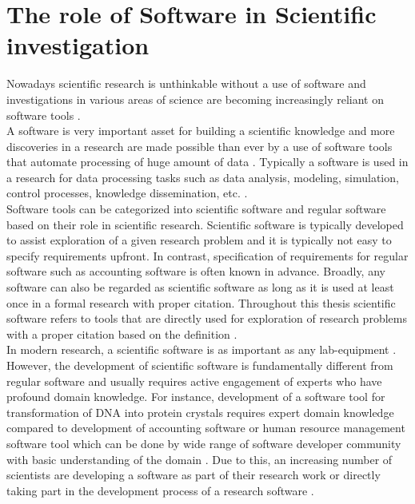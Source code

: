 \chapter{The role of Software in Scientific investigation}
\label{ch:Roles}

%

Nowadays scientific research is unthinkable without a use of software and investigations in various areas of science are becoming increasingly reliant on software tools \citep{goble2014better, storer2017bridging, hannay2009scientists, jimenez2017four}. \\

A software is very important asset for building a scientific knowledge and more discoveries in a research are made possible than ever by a use of software tools that automate processing of huge amount of data \citep{jimenez2017four}. Typically a software is used in a research for data processing tasks such as data analysis, modeling, simulation, control processes, knowledge dissemination, etc. \citep{hannay2009scientists, pan2016disciplinary}. \\


Software tools can be categorized into scientific software and regular software based on their role in scientific research. Scientific software is typically developed to assist exploration of a given research problem and it is typically not easy to specify requirements upfront. In contrast, specification of requirements for regular software such as accounting software is often known in advance. Broadly, any software can also be regarded as scientific software as long as it is used at least once in a formal research with proper citation. Throughout this thesis scientific software refers to tools that are directly used for exploration of research problems with a proper citation based on the definition \citep{hannay2009scientists,goble2014better}. \\


In modern research, a scientific software is as important as any lab-equipment \citep{wilson2014best}. However, the development of scientific software is fundamentally different from regular software and usually requires active engagement of experts who have profound domain knowledge. For instance, development of a software tool for transformation of \ac{DNA} into protein crystals requires expert domain knowledge compared to development of accounting software or human resource management software tool which can be done by wide range of software developer community with basic understanding of the domain \citep{wilson2014best, segal2008developing}. Due to this, an increasing number of scientists are developing a software as part of their research work or directly taking part in the development process of a research software \citep{jimenez2017four, kanewala2014testing}. \\


